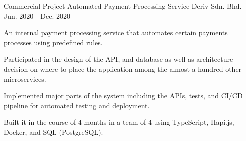 \begin{cventries}
  \cventry
    {Commercial Project} %
    {Automated Payment Processing Service} %
    {Deriv Sdn. Bhd.} %
    {Jun. 2020 - Dec. 2020} %
    {
      \begin{cvitems} %
        \item {An internal payment processing service that automates certain payments processes using predefined rules.}
        \item {Participated in the design of the API, and database as well as architecture decision on where to place the application among the almost a hundred other microservices.}
        \item {Implemented major parts of the system including the APIs, tests, and CI/CD pipeline for automated testing and deployment.}
        \item {Built it in the course of 4 months in a team of 4 using TypeScript, Hapi.js, Docker, and SQL (PostgreSQL).}
      \end{cvitems}
    }

\end{cventries}